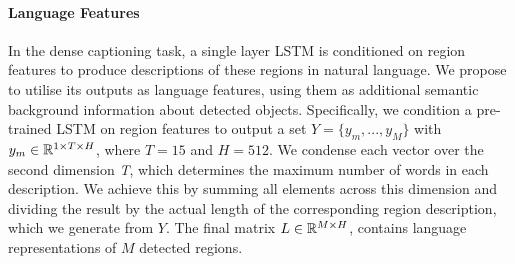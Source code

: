 \documentclass[11pt,a4paper]{article}
\newcommand{\kibitz}[2]{\ifnum\Comments=1\textcolor{#1}{#2}\fi}
\newcommand{\nikolai}[1]{\kibitz{red}   {[Nikolai: #1]}}
\newcommand{\R}{\mathbb{R}}
\begin{document}
\paragraph{Language Features}
In the dense captioning task, a single layer LSTM is conditioned on region features to produce descriptions of these regions in natural language.
We propose to utilise its outputs as language features, using them as additional semantic background information about detected objects.
Specifically, we condition a pre-trained LSTM on region features to output a set ${Y = \{y_m, ..., y_M\}}$ with $y_m \in \R\sp{1 \times T \times H}$, where $T=15$ and $H=512$.
We condense each vector over the second dimension \textit{T}, which determines the maximum number of words in each description. %
We achieve this by summing all elements across this dimension and dividing the result by the actual length of the corresponding region description, which we generate from $Y$.
The final matrix $L \in \R\sp{M \times H}$, contains language representations of $M$ detected regions.

\end{document}
